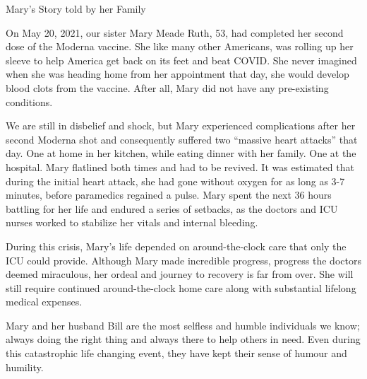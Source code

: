 Mary’s Story told by her Family

On May 20, 2021, our sister Mary Meade Ruth, 53, had completed her second dose
of the Moderna vaccine. She like many other Americans, was rolling up her sleeve
to help America get back on its feet and beat COVID. She never imagined when she
was heading home from her appointment that day, she would develop blood clots
from the vaccine. After all, Mary did not have any pre-existing conditions.

We are still in disbelief and shock, but Mary experienced complications after
her second Moderna shot and consequently suffered two “massive heart attacks”
that day. One at home in her kitchen, while eating dinner with her family. One
at the hospital. Mary flatlined both times and had to be revived. It was
estimated that during the initial heart attack, she had gone without oxygen for
as long as 3-7 minutes, before paramedics regained a pulse. Mary spent the next
36 hours battling for her life and endured a series of setbacks, as the doctors
and ICU nurses worked to stabilize her vitals and internal bleeding.

During this crisis, Mary’s life depended on around-the-clock care that only the
ICU could provide. Although Mary made incredible progress, progress the doctors
deemed miraculous, her ordeal and journey to recovery is far from over. She will
still require continued around-the-clock home care along with substantial
lifelong medical expenses.

Mary and her husband Bill are the most selfless and humble individuals we know;
always doing the right thing and always there to help others in need. Even
during this catastrophic life changing event, they have kept their sense of
humour and humility.

